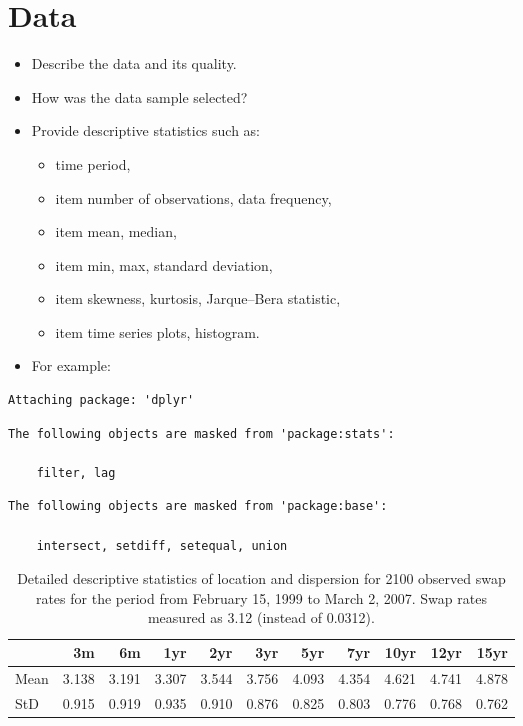 \documentclass[a4paper,11pt]{article}
\begin{document}
\hypertarget{sec:data}{%
\section{Data}\label{sec:data}}
\begin{itemize}
\item
  Describe the data and its quality.
\item
  How was the data sample selected?
\item
  Provide descriptive statistics such as:
  \begin{itemize}
  \item
    time period,
  \item
    item number of observations, data frequency,
  \item
    item mean, median,
  \item
    item min, max, standard deviation,
  \item
    item skewness, kurtosis, Jarque--Bera statistic,
  \item
    item time series plots, histogram.
  \end{itemize}
\item
  For example:
\end{itemize}
\begin{verbatim}
Attaching package: 'dplyr'
\end{verbatim}
\begin{verbatim}
The following objects are masked from 'package:stats':

    filter, lag
\end{verbatim}
\begin{verbatim}
The following objects are masked from 'package:base':

    intersect, setdiff, setequal, union
\end{verbatim}
\begin{table}[H]

\caption{\label{tab:table1}Detailed descriptive statistics of location and dispersion for 2100 observed swap rates for the period from February 15, 1999 to March 2, 2007. Swap rates measured as 3.12 (instead of 0.0312).}
\centering
\begin{tabular}[t]{lrrrrrrrrrr}
\toprule
  & 3m & 6m & 1yr & 2yr & 3yr & 5yr & 7yr & 10yr & 12yr & 15yr\\
\midrule
Mean & 3.138 & 3.191 & 3.307 & 3.544 & 3.756 & 4.093 & 4.354 & 4.621 & 4.741 & 4.878\\
StD & 0.915 & 0.919 & 0.935 & 0.910 & 0.876 & 0.825 & 0.803 & 0.776 & 0.768 & 0.762\\
\midrule
\bottomrule
\end{tabular}
\end{table}
\end{document}
